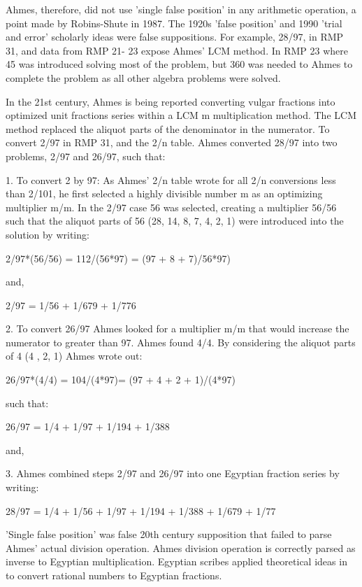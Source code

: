 \documentclass[12pt]{article}
\begin{document}
Ahmes, therefore, did not use 'single false position' in any arithmetic operation, a point made by Robins-Shute in 1987. The 1920s 'false position' and 1990 'trial and error' scholarly ideas were false suppositions. For example, 28/97, in RMP 31, and data from RMP 21- 23 expose Ahmes' LCM method. In RMP 23 where 45 was introduced solving most of the problem, but 360 was needed to Ahmes to complete the problem as all other algebra problems were solved.

In the 21st century, Ahmes is being reported converting vulgar fractions into optimized unit fractions series within a LCM m multiplication method. The LCM method replaced the aliquot parts of the denominator in the numerator. To convert 2/97 in RMP 31, and the 2/n table. Ahmes converted 28/97 into two problems, 2/97 and 26/97, such that:

1. To convert 2 by 97: As Ahmes' 2/n table wrote for all 2/n conversions less than 2/101, he first selected a highly divisible number m as an optimizing multiplier m/m. In the 2/97 case 56 was selected, creating a multiplier 56/56 such that the aliquot parts of 56 (28, 14, 8, 7, 4, 2, 1) were introduced into the solution by writing: 

2/97*(56/56) = 112/(56*97) = (97 + 8 + 7)/56*97)

and,

2/97 = 1/56 + 1/679 + 1/776 

2. To convert 26/97 Ahmes looked for a multiplier m/m that would increase the numerator to greater than 97. Ahmes found 4/4. By considering the aliquot parts of 4 (4 , 2, 1) Ahmes wrote out:

26/97*(4/4) = 104/(4*97)= (97 + 4 + 2 + 1)/(4*97)

such that:

26/97 = 1/4 +  1/97 + 1/194 + 1/388

and,

3. Ahmes combined steps 2/97 and 26/97 into one Egyptian fraction series by writing:

28/97 = 1/4 + 1/56 + 1/97 + 1/194 + 1/388 + 1/679 + 1/77

'Single false position' was false 20th century supposition that failed to parse Ahmes' actual division operation. Ahmes division operation is correctly parsed as inverse to Egyptian multiplication. Egyptian scribes applied theoretical ideas in  to convert rational numbers to Egyptian fractions.
\end{document}
